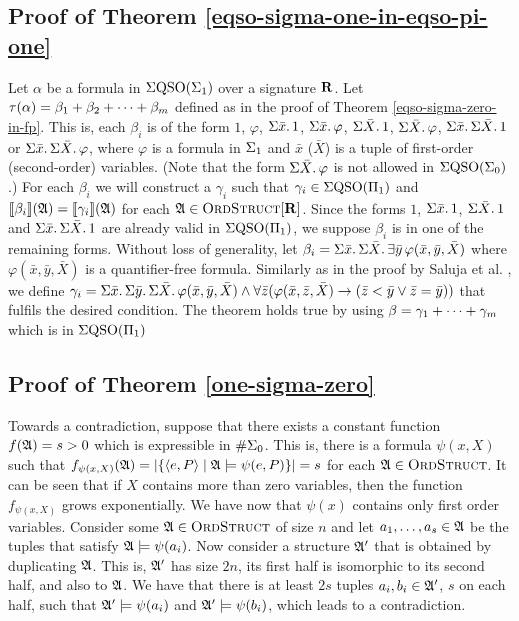 \subsection{Proof of Theorem \ref{eqso-sigma-one-in-eqso-pi-one}}

Let $\alpha$ be a formula in $\Sigma{\rm QSO}(\Sigma_{1})$ over a signature $\mathbf{R}$. Let $\tau(\alpha) = \beta_1+\beta_2+\cdots+\beta_m$ defined as in the proof of Theorem \ref{eqso-sigma-zero-in-fp}. This is, each $\beta_i$ is of the form $1$, $\varphi$, $\Sigma{\bar{x}}.\,1$, $\Sigma{\bar{x}}.\,\varphi$, $\Sigma{\bar{X}}.\,1$, $\Sigma{\bar{X}}.\,\varphi$, $\Sigma{\bar{x}}.\,\Sigma{\bar{X}}.\,1$ or $\Sigma{\bar{x}}.\,\Sigma{\bar{X}}.\,\varphi$, where $\varphi$ is a formula in $\Sigma_{1}$ and $\bar{x}$ ($\bar{X}$) is a tuple of first-order (second-order) variables. (Note that the form $\Sigma{\bar{X}}.\,\varphi$ is not allowed in $\Sigma{\rm QSO}(\Sigma_{0})$.) For each $\beta_i$ we will construct a $\gamma_i$ such that $\gamma_i \in \Sigma{\rm QSO}(\Pi_{1})$ and ${\llbracket{}{\beta_i}\rrbracket}(\mathfrak{A}) = {\llbracket{}{\gamma_i}\rrbracket}(\mathfrak{A})$ for each $\mathfrak{A}\in\text{\sc OrdStruct}[\mathbf{R}]$. Since the forms $1$, $\Sigma{\bar{x}}.\,1$, $\Sigma{\bar{X}}.\,1$ and $\Sigma{\bar{x}}.\,\Sigma{\bar{X}}.\,1$ are already valid in $\Sigma{\rm QSO}(\Pi_{1})$, we suppose $\beta_i$ is in one of the remaining forms. Without loss of generality, let $\beta_i = \Sigma{\bar{x}}.\,\Sigma{\bar{X}}.\,\exists\bar{y}\,\varphi(\bar{x},\bar{y},\bar{X})$ where $\varphi(\bar{x},\bar{y},\bar{X})$ is a quantifier-free formula. Similarly as in the proof by Saluja et al. \cite{DBLP:journals/jcss/SalujaST95}, we define $\gamma_i = \Sigma{\bar{x}}.\,\Sigma{\bar{y}}.\,\Sigma{\bar{X}}.\,\varphi(\bar{x},\bar{y},\bar{X}) \wedge \forall\bar{z}(\varphi(\bar{x},\bar{z},\bar{X})\to(\bar{z} < \bar{y} \vee \bar{z} = \bar{y}))$ that fulfils the desired condition. The theorem holds true by using $\beta = \gamma_1+\cdots+\gamma_m$ which is in $\Sigma{\rm QSO}(\Pi_{1})$

\subsection{Proof of Theorem \ref{one-sigma-zero}}

Towards a contradiction, suppose that there exists a constant function $f(\mathfrak{A}) = s > 0$ which is expressible in $\#\Sigma_{0}$. This is, there is a formula $\psi(x,X)$ such that $f_{\psi(x,X)}(\mathfrak{A}) = \vert \{ \langle e,P\rangle \mid \mathfrak{A}\models\psi(e,P) \} \vert = s$ for each $\mathfrak{A}\in\text{\sc OrdStruct}$. It can be seen that if $X$ contains more than zero variables, then the function $f_{\psi(x,X)}$ grows exponentially. We have now that $\psi(x)$ contains only first order variables. Consider some $\mathfrak{A} \in \text{\sc OrdStruct}$ of size $n$ and let $a_1,\ldots,a_s\in \mathfrak{A}$ be the tuples that satisfy $\mathfrak{A} \models \psi(a_i)$. Now consider a structure $\mathfrak{A}'$ that is obtained by duplicating $\mathfrak{A}$. This is, $\mathfrak{A}'$ has size $2n$, its first half is isomorphic to its second half, and also to $\mathfrak{A}$. We have that there is at least $2s$ tuples $a_i,b_i\in \mathfrak{A}'$, $s$ on each half, such that $\mathfrak{A}'\models\psi(a_i)$ and $\mathfrak{A}'\models\psi(b_i)$, which leads to a contradiction.

